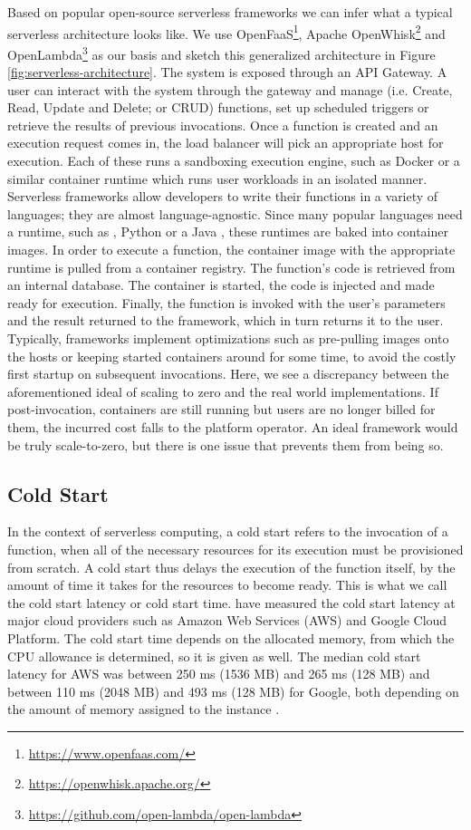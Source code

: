 Based on popular open-source serverless frameworks we can infer what a typical serverless architecture looks like. We use OpenFaaS\footnote{\url{https://www.openfaas.com/}}, Apache OpenWhisk\footnote{\url{https://openwhisk.apache.org/}} and OpenLambda\footnote{\url{https://github.com/open-lambda/open-lambda}} as our basis and sketch this generalized architecture in Figure \ref{fig:serverless-architecture}. The system is exposed through an API Gateway. A user can interact with the system through the gateway and manage (i.e. Create, Read, Update and Delete; or CRUD) functions, set up scheduled triggers or retrieve the results of previous invocations. Once a function is created and an execution request comes in, the load balancer will pick an appropriate host for execution. Each of these runs a sandboxing execution engine, such as Docker or a similar container runtime which runs user workloads in an isolated manner.
Serverless frameworks allow developers to write their functions in a variety of languages; they are almost language-agnostic. Since many popular languages need a runtime, such as , Python or a Java , these runtimes are baked into container images. In order to execute a function, the container image with the appropriate runtime is pulled from a container registry.
The function's code is retrieved from an internal database. The container is started, the code is injected and made ready for execution. Finally, the function is invoked with the user's parameters and the result returned to the framework, which in turn returns it to the user. Typically, frameworks implement optimizations such as pre-pulling images onto the hosts or keeping started containers around for some time, to avoid the costly first startup on subsequent invocations. Here, we see a discrepancy between the aforementioned ideal of scaling to zero and the real world implementations. If post-invocation, containers are still running but users are no longer billed for them, the incurred cost falls to the platform operator. An ideal framework would be truly scale-to-zero, but there is one issue that prevents them from being so.

\subsection{Cold Start}

In the context of serverless computing, a cold start refers to the invocation of a function, when all of the necessary resources for its execution must be provisioned from scratch. A cold start thus delays the execution of the function itself, by the amount of time it takes for the resources to become ready. This is what we call the cold start latency or cold start time. \citeauthor{Wang2018} have measured the cold start latency at major cloud providers such as Amazon Web Services (AWS) and Google Cloud Platform. The cold start time depends on the allocated memory, from which the CPU allowance is determined, so it is given as well. The median cold start latency for AWS was between 250 ms (1536 MB) and 265 ms (128 MB) and between 110 ms (2048 MB) and 493 ms (128 MB) for Google, both depending on the amount of memory assigned to the instance \cite{Wang2018}.

